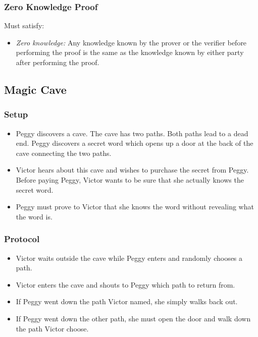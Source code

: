 \documentclass{beamer}
\begin{document}
\begin{frame}
	\frametitle{Zero Knowledge Proof}
	Must satisfy:
	\begin{itemize}
		\item \textit{Zero knowledge:} Any knowledge known by
	the prover or the verifier before performing the proof is the same
	as the knowledge known by either party after performing the proof.		
	\end{itemize}
\end{frame}

\subsection{Magic Cave}

\begin{frame}
	\frametitle{Setup}
	\begin{itemize}
		\item Peggy discovers a cave. The cave has two paths. 
		Both paths lead to a dead end. Peggy
		discovers a secret word which opens up a door at the back of the cave
		connecting the two paths.
		
		\item Victor hears about this cave and wishes to purchase the secret from
		Peggy. Before paying Peggy, Victor wants to be sure that she actually
		knows the secret word.
		
		\item Peggy must prove to Victor that she knows the word without revealing
		what the word is.
	\end{itemize}
\end{frame}

\begin{frame}
	\frametitle{Protocol}
	\begin{itemize}
		\item Victor waits outside the cave while Peggy enters and randomly chooses
		a path.
		
		\item Victor enters the cave and shouts to Peggy which path to return
		from.
		
		\item If Peggy went down the path Victor named, she simply walks back out.
		
		\item If Peggy went down the other path, she must open the door and
		walk down the path Victor choose.
		
	\end{itemize}
\end{frame}
\end{document}
